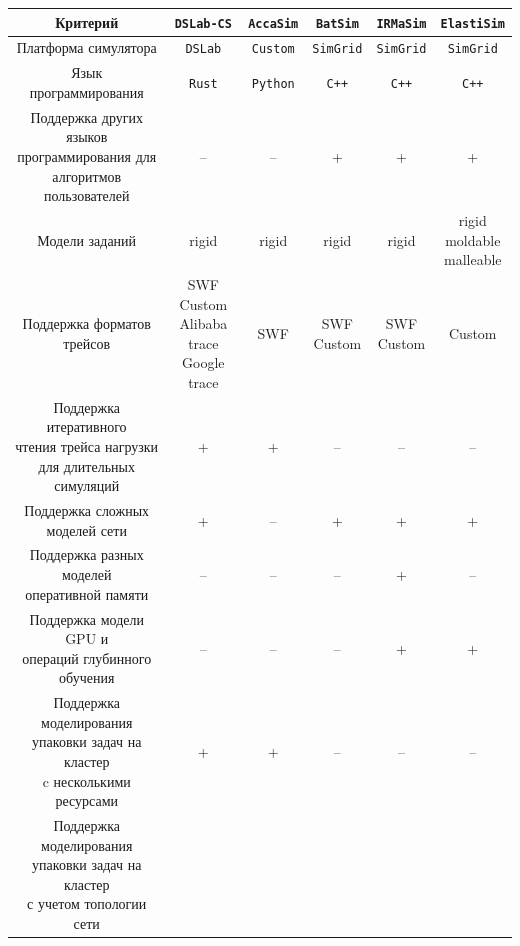 \begin{table}[h!]
  \small
\centering
\begin{tabular}{|c|c|c|c|c|c|}
\hline
\textbf{Критерий} & \texttt{DSLab-CS} & \texttt{AccaSim} & \texttt{BatSim} & \texttt{IRMaSim} & \texttt{ElastiSim} \\
\hline
Платформа симулятора & \texttt{DSLab} & \texttt{Custom} & \texttt{SimGrid} & \texttt{SimGrid} & \texttt{SimGrid} \\
\hline
Язык программирования & \texttt{Rust} & \texttt{Python} & \texttt{C++} &  \texttt{C++} &  \texttt{C++} \\
\hline
\makecell{Поддержка других языков \\ программирования для \\ алгоритмов пользователей} & -- & -- & + & + & + \\
\hline
Модели заданий & rigid & rigid & rigid & rigid & \makecell[cc]{rigid\\moldable\\malleable} \\
\hline
Поддержка форматов трейсов & \makecell[cc] {
  SWF\\
  Custom\\
  Alibaba trace\\
  Google trace
} & SWF & \makecell[cc]{SWF\\Custom} & \makecell[cc]{SWF\\Custom} & Custom \\
\hline 
\makecell[cc]{
  Поддержка итеративного \\ чтения трейса нагрузки \\ для длительных симуляций
} & + & + & -- & -- & -- \\
\hline 
\makecell[cc]{
Поддержка сложных \\ моделей сети} & + & -- & + & + & + \\
\hline
\makecell[cc] {
  Поддержка разных моделей \\ оперативной памяти
} & -- & -- & -- & + & -- \\
\hline 
\makecell[cc] {
  Поддержка модели GPU и \\ операций глубинного обучения
} & -- & -- & -- & + & + \\
\hline
\makecell[cc]{
  Поддержка моделирования \\ упаковки задач на кластер \\ c несколькими ресурсами 
} & + & + & -- & -- & -- \\
\hline
\makecell[cc]{
  Поддержка моделирования \\ упаковки задач на кластер \\ с учетом топологии сети
}
\end{tabular}
\end{table}
